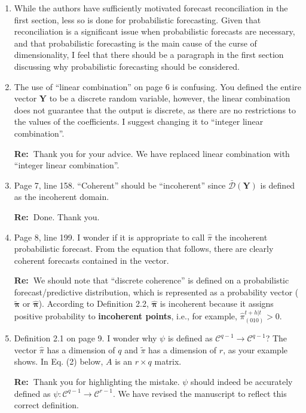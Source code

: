 \documentclass[11pt,a4paper]{article}
\newcommand{\RE}[2][Re:~]{{\color{blue}\textbf{#1}#2}}
\begin{document}
\begin{enumerate}
    \item While the authors have sufficiently motivated forecast reconciliation in the first section, less so is done for probabilistic forecasting. Given that reconciliation is a significant issue when probabilistic forecasts are necessary, and that probabilistic forecasting is the main cause of the curse of dimensionality, I feel that there should be a paragraph in the first section discussing why probabilistic forecasting should be considered.
    \item The use of ``linear combination'' on page 6 is confusing. You defined the entire vector $\mathbf{Y}$ to be a discrete random variable, however, the linear combination does not guarantee that the output is discrete, as there are no restrictions to the values of the coefficients. I suggest changing it to ``integer linear combination''.
    
    \RE{Thank you for your advice. We have replaced linear combination with ``integer linear combination''.}

    \item  Page 7, line 158. ``Coherent'' should be ``incoherent'' since $\bar{\mathcal{D}}(\mathbf{Y})$ is defined as the
    incoherent domain.

    \RE{Done. Thank you.}

    \item Page 8, line 199. I wonder if it is appropriate to call $\hat{\pi}$ the incoherent probabilistic forecast. From the equation that follows, there are clearly coherent forecasts contained in the vector.
    
    \RE{We should note that ``discrete coherence'' is defined on a probabilistic forecast/predictive distribution, which is represented as a probability vector ($\tilde{\boldsymbol{\pi}}$ or $\hat{\boldsymbol{\pi}}$). According to Definition 2.2, $\hat{\boldsymbol{\pi}}$ is incoherent because it assigns positive probability to \textbf{incoherent points}, i.e., for example, $\hat \pi^{t+h|t}_{(010)} > 0$}.

    \item Definition 2.1 on page 9. I wonder why $\psi$ is defined as $\mathcal{C}^{q-1} \rightarrow \mathcal{C}^{q-1}$? The vector $\hat \pi$ has a dimension of $q$ and $\tilde{\pi}$ has a dimension of $r$, as your example shows. In Eq. (2) below, $A$ is an $r\times q$ matrix.
    
    \RE{Thank you for highlighting the mistake. $\psi$ should indeed be accurately defined as $\psi: \mathcal{C}^{q-1} \rightarrow \mathcal{C}^{r-1}$. We have revised the manuscript to reflect this correct definition.}


\end{enumerate}
\end{document}
